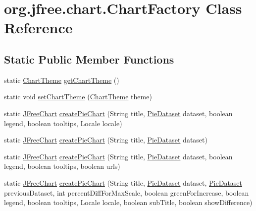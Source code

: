 \hypertarget{classorg_1_1jfree_1_1chart_1_1_chart_factory}{}\section{org.\+jfree.\+chart.\+Chart\+Factory Class Reference}
\label{classorg_1_1jfree_1_1chart_1_1_chart_factory}
\subsection*{Static Public Member Functions}
\begin{DoxyCompactItemize}
\item 
static \mbox{\hyperlink{interfaceorg_1_1jfree_1_1chart_1_1_chart_theme}{Chart\+Theme}} \mbox{\hyperlink{classorg_1_1jfree_1_1chart_1_1_chart_factory_a97de42d02f96b00dc7a3f409d52987d4}{get\+Chart\+Theme}} ()
\item 
static void \mbox{\hyperlink{classorg_1_1jfree_1_1chart_1_1_chart_factory_a413867a6a72db2c4c424f9eb76592a69}{set\+Chart\+Theme}} (\mbox{\hyperlink{interfaceorg_1_1jfree_1_1chart_1_1_chart_theme}{Chart\+Theme}} theme)
\item 
static \mbox{\hyperlink{classorg_1_1jfree_1_1chart_1_1_j_free_chart}{J\+Free\+Chart}} \mbox{\hyperlink{classorg_1_1jfree_1_1chart_1_1_chart_factory_ad3dfdf8d8795bc06118a0b355953508d}{create\+Pie\+Chart}} (String title, \mbox{\hyperlink{interfaceorg_1_1jfree_1_1data_1_1general_1_1_pie_dataset}{Pie\+Dataset}} dataset, boolean legend, boolean tooltips, Locale locale)
\item 
static \mbox{\hyperlink{classorg_1_1jfree_1_1chart_1_1_j_free_chart}{J\+Free\+Chart}} \mbox{\hyperlink{classorg_1_1jfree_1_1chart_1_1_chart_factory_a3421392daae0e613a846263adae43d7f}{create\+Pie\+Chart}} (String title, \mbox{\hyperlink{interfaceorg_1_1jfree_1_1data_1_1general_1_1_pie_dataset}{Pie\+Dataset}} dataset)
\item 
static \mbox{\hyperlink{classorg_1_1jfree_1_1chart_1_1_j_free_chart}{J\+Free\+Chart}} \mbox{\hyperlink{classorg_1_1jfree_1_1chart_1_1_chart_factory_a1c32b9ffd3e9cf08821a96794193851e}{create\+Pie\+Chart}} (String title, \mbox{\hyperlink{interfaceorg_1_1jfree_1_1data_1_1general_1_1_pie_dataset}{Pie\+Dataset}} dataset, boolean legend, boolean tooltips, boolean urls)
\item 
static \mbox{\hyperlink{classorg_1_1jfree_1_1chart_1_1_j_free_chart}{J\+Free\+Chart}} \mbox{\hyperlink{classorg_1_1jfree_1_1chart_1_1_chart_factory_ae51d439575335153c94bc87fa9781b36}{create\+Pie\+Chart}} (String title, \mbox{\hyperlink{interfaceorg_1_1jfree_1_1data_1_1general_1_1_pie_dataset}{Pie\+Dataset}} dataset, \mbox{\hyperlink{interfaceorg_1_1jfree_1_1data_1_1general_1_1_pie_dataset}{Pie\+Dataset}} previous\+Dataset, int percent\+Diff\+For\+Max\+Scale, boolean green\+For\+Increase, boolean legend, boolean tooltips, Locale locale, boolean sub\+Title, boolean show\+Difference)

\end{DoxyCompactItemize}
